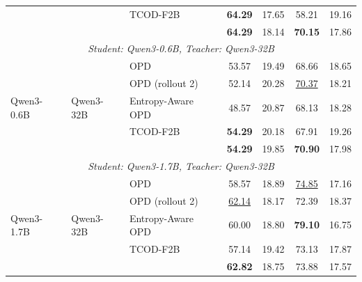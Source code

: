 \begin{table}[t]
{\begin{tabular}{lllcccc}
 & & TCOD-F2B & \textbf{64.29} & 17.65 & 58.21 & 19.16 \\
 & & \ours{} & \textbf{64.29} & 18.14 & \textbf{70.15} & 17.86 \\
\midrule
\multicolumn{7}{c}{\textit{Student: Qwen3-0.6B, Teacher: Qwen3-32B}} \\
\midrule
\multirow{5}{*}{Qwen3-0.6B} & \multirow{5}{*}{Qwen3-32B} & OPD & 53.57 & 19.49 & 68.66 & 18.65 \\
 & & OPD (rollout 2) & 52.14 & 20.28 & \underline{70.37} & 18.21 \\
 & & Entropy-Aware OPD & 48.57 & 20.87 & 68.13 & 18.28 \\
 & & TCOD-F2B & \textbf{54.29} & 20.18 & 67.91 & 19.26 \\
 & & \ours{} & \textbf{54.29} & 19.85 & \textbf{70.90} & 17.98 \\
\midrule
\multicolumn{7}{c}{\textit{Student: Qwen3-1.7B, Teacher: Qwen3-32B}} \\
\midrule
\multirow{5}{*}{Qwen3-1.7B} & \multirow{5}{*}{Qwen3-32B} & OPD & 58.57 & 18.89 & \underline{74.85} & 17.16 \\
 & & OPD (rollout 2) & \underline{62.14} & 18.17 & 72.39 & 18.37 \\
 & & Entropy-Aware OPD & 60.00 & 18.80 & \textbf{79.10} & 16.75 \\
 & & TCOD-F2B & 57.14 & 19.42 & 73.13 & 17.87 \\
 & & \ours{} & \textbf{62.82} & 18.75 & 73.88 & 17.57 \\
\bottomrule
\end{tabular}%
}
\end{table}
%
